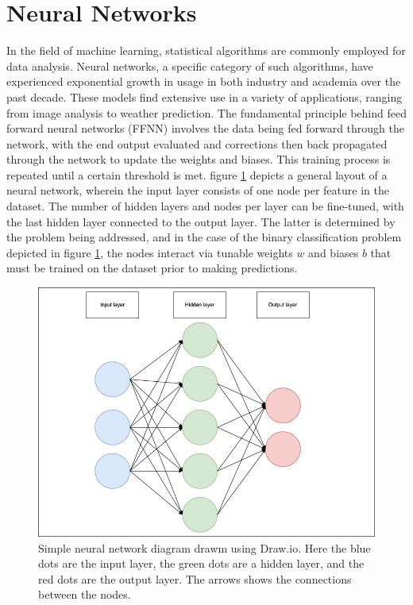 \section{Neural Networks}
In the field of machine learning, statistical algorithms are commonly employed for data analysis. 
Neural networks, a specific category of such algorithms, have experienced exponential growth in 
usage in both industry and academia over the past decade. These models find extensive use in a 
variety of applications, ranging from image analysis to weather prediction. The fundamental principle 
behind feed forward neural networks (FFNN) involves the data being fed forward through the network,
 with the end output evaluated and corrections then back propagated through the network to update 
 the weights and biases. This training process is repeated until a certain threshold is met. 
 figure \ref{fig:nndiagram} depicts a general layout of a neural network, wherein the input layer consists of 
 one node per feature in the dataset. The number of hidden layers and nodes per layer can be 
 fine-tuned, with the last hidden layer connected to the output layer. The latter is determined 
 by the problem being addressed, and in the case of the binary classification problem depicted 
 in figure \ref{fig:nndiagram}, the nodes interact via tunable weights $w$ and biases $b$ that must 
 be trained on the dataset prior to making predictions.

\begin{figure}[H]
    \includegraphics[width=\linewidth]{Figures/Machinelearning/nn_diagram.jpeg}
    \caption[Simple diagram of a neural network]{Simple neural network diagram drawm using Draw.io. Here the blue dots are the input layer, the green dots are a hidden layer, 
    and the red dots are the output layer. The arrows shows the connections between the nodes. }
    \label{fig:nndiagram}
\end{figure}

